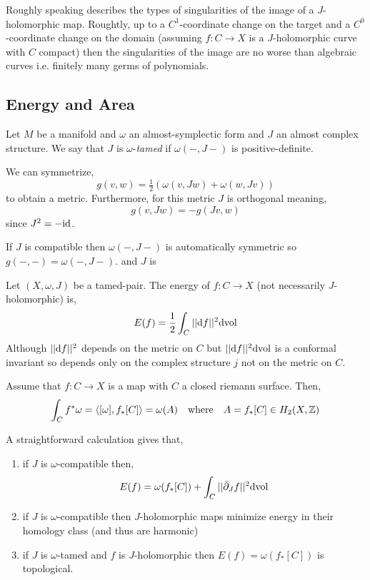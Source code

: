 \documentclass[12pt]{article}
\newcommand{\dbar}{\bar{\partial}}
\begin{document}
\begin{thm}
Roughly speaking describes the types of singularities of the image of a $J$-holomorphic map. Roughtly, up to a $C^1$-coordinate change on the target and a $C^0$-coordinate change on the domain (assuming $f : C \to X$ is a $J$-holomorphic curve with $C$ compact) then the singularities of the image are no worse than algebraic curves i.e. finitely many germs of polynomials. 
\end{thm}

\subsection{Energy and Area}

\begin{defn}
Let $M$ be a manifold and $\omega$ an almost-symplectic form and $J$ an almost complex structure. We say that $J$ is $\omega$-\textit{tamed} if $\omega(-,J-)$ is positive-definite.
\end{defn}

\begin{rmk}
We can symmetrize,
\[ g(v,w) = \tfrac{1}{2} (\omega(v, Jw) + \omega(w, Jv)) \]
to obtain a metric. Furthermore, for this metric $J$ is orthogonal meaning,
\[ g(v, Jw) = -g(Jv, w) \]
since $J^2 = - \mathrm{id}$. 
\end{rmk}

\begin{rmk}
If $J$ is compatible then $\omega(-,J-)$ is automatically symmetric so $g(-,-) = \omega(-,J-)$.
and $J$ is 
\end{rmk}

\begin{defn}
Let $(X, \omega, J)$ be a tamed-pair. The energy of $f : C \to X$ (not necessarily $J$-holomorphic) is,
\[ E(f) = \frac{1}{2} \int_C ||\mathrm{d}{f}||^2 \mathrm{d}{\mathrm{vol}} \]
Although $||\mathrm{d}{f}||^2$ depends on the metric on $C$ but $||\mathrm{d}{f}||^2 \mathrm{d}{\mathrm{vol}}$ is a conformal invariant so depends only on the complex structure $j$ not on the metric on $C$. 
\end{defn}

Assume that $f : C \to X$ is a map with $C$ a closed riemann surface. Then,
\[ \int_C f^* \omega = \left< [\omega], f_*[C] \right> = \omega(A) \quad \text{where} \quad A = f_* [C] \in H_2(X, \mathbb{Z}) \]

\begin{prop}
A straightforward calculation gives that,
\begin{enumerate}
\item if $J$ is $\omega$-compatible then,
\[ E(f) = \omega(f_* [C]) + \int_C || \dbar_J f ||^2 \d{\mathrm{vol}} \]
\item if $J$ is $\omega$-compatible then $J$-holomorphic maps minimize energy in their homology class (and thus are harmonic)
\item if $J$ is $\omega$-tamed and $f$ is $J$-holomorphic then $E(f) = \omega(f_* [C])$ is topological.
\end{enumerate}
\end{prop}
\end{document}
